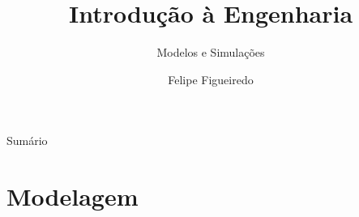 \documentclass{beamer}
\title%
{Introdução à Engenharia}
\subtitle
{Modelos e Simulações} %
\author%
{Felipe Figueiredo}%
\institute[UNIAN] %
{Centro Universitário Anhanguera de Niterói
}
\date%
{}
\begin{document}
\begin{frame}
  \titlepage
\end{frame}

\begin{frame}{Sumário}
  \tableofcontents
\end{frame}








\section{Modelagem}
\end{document}
